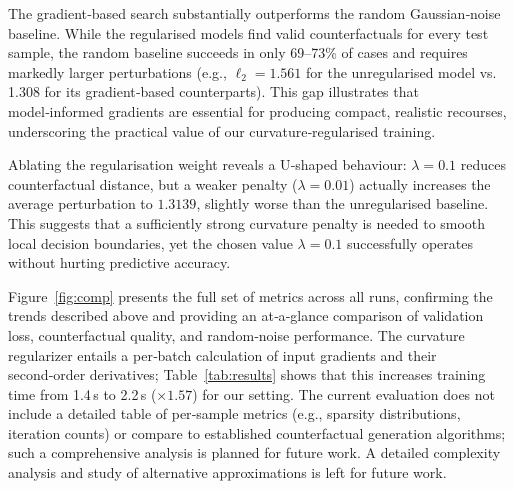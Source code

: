 \documentclass[11pt,a4paper]{article}
\begin{document}
The gradient‑based search substantially outperforms the random Gaussian‑noise baseline. While the regularised models find valid counterfactuals for every test sample, the random baseline succeeds in only 69–73\% of cases and requires markedly larger perturbations (e.g., \(\ell_2 = 1.561\) for the unregularised model vs. 1.308 for its gradient‑based counterparts). This gap illustrates that model‑informed gradients are essential for producing compact, realistic recourses, underscoring the practical value of our curvature‑regularised training.

Ablating the regularisation weight reveals a U‑shaped behaviour: \(\lambda = 0.1\) reduces counterfactual distance, but a weaker penalty (\(\lambda = 0.01\)) actually increases the average perturbation to \(1.3139\), slightly worse than the unregularised baseline. This suggests that a sufficiently strong curvature penalty is needed to smooth local decision boundaries, yet the chosen value \(\lambda = 0.1\) successfully operates without hurting predictive accuracy.

Figure~\ref{fig:comp} presents the full set of metrics across all runs, confirming the trends described above and providing an at‑a‑glance comparison of validation loss, counterfactual quality, and random‑noise performance.  The curvature regularizer entails a per‑batch calculation of input gradients and their second‑order derivatives; Table~\ref{tab:results} shows that this increases training time from 1.4\,s to 2.2\,s ($\times 1.57$) for our setting.  The current evaluation does not include a detailed table of per‑sample metrics (e.g., sparsity distributions, iteration counts) or compare to established counterfactual generation algorithms; such a comprehensive analysis is planned for future work.  A detailed complexity analysis and study of alternative approximations is left for future work.
\end{document}
